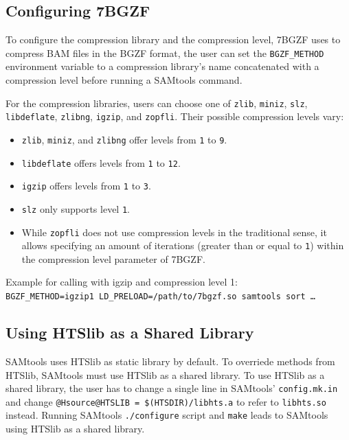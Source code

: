 \subsection{Configuring 7BGZF}\label{7bgzfConfig}

To configure the compression library and the compression level, 7BGZF uses to compress BAM files in the BGZF format, the user can set the \texttt{BGZF\_METHOD} environment variable to a compression library's name concatenated with a compression level before running a SAMtools command. 

For the compression libraries, users can choose one of {\texttt{zlib}}, {\texttt{miniz}}, {\texttt{slz}}, {\texttt{libdeflate}}, {\texttt{zlibng}}, {\texttt{igzip}}, and {\texttt{zopfli}}. Their possible compression levels vary:

\begin{itemize}
\itemsep 0mm
    \item {\texttt{zlib}}, {\texttt{miniz}}, and {\texttt{zlibng}} offer levels from \texttt{1} to \texttt{9}.
    \item {\texttt{libdeflate}} offers levels from \texttt{1} to \texttt{12}.
    \item {\texttt{igzip}} offers levels from \texttt{1} to \texttt{3}.
    \item {\texttt{slz}} only supports level \texttt{1}.
    \item While {\texttt{zopfli}} does not use compression levels in the traditional sense, it allows specifying an amount of iterations (greater than or equal to \texttt{1}) within the compression level parameter of 7BGZF.
\end{itemize}

Example for calling \sort with igzip and compression level 1: \\
\texttt{BGZF\_METHOD=igzip1 LD\_PRELOAD=/path/to/7bgzf.so samtools sort …}

\subsection{Using HTSlib as a Shared Library}\label{shared}

SAMtools uses HTSlib as static library by default. To overriede methods from HTSlib, SAMtools must use HTSlib as a shared library.
To use HTSlib as a shared library, the user has to change a single line in SAMtools' \texttt{config.mk.in} and change \texttt{@Hsource@HTSLIB = \$(HTSDIR)/libhts.a} to refer to \texttt{libhts.so} instead. Running SAMtools \texttt{./configure} script and \texttt{make} leads to SAMtools using HTSlib as a shared library.


